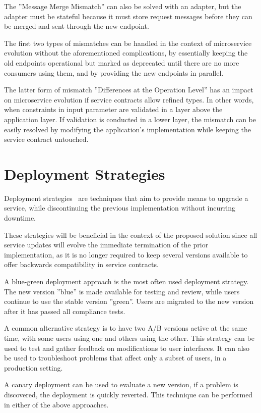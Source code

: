 The ''Message Merge Mismatch'' can also be solved with an adapter, but the adapter must be stateful because it must store request messages before they can be merged and sent through the new endpoint.

The first two types of mismatches can be handled in the context of microservice evolution without the aforementioned complications,
by essentially keeping the old endpoints operational but marked as deprecated until  there are no more consumers using them, and by providing the new endpoints in parallel.

The latter form of mismatch ''Differences at the Operation Level'' has an impact on microservice evolution if service contracts allow refined types.
In other words, when constraints in input parameter are validated in a layer above the application layer.
If validation is conducted in a lower layer, the mismatch can be easily resolved by modifying the application's implementation while keeping the service contract untouched.

\section{Deployment Strategies} %
\label{sec:deployment_strategies}

Deployment strategies~\cite{deploymentstrategies} are techniques that aim to provide means to upgrade a service,
while discontinuing the previous implementation without incurring downtime.

These strategies will be beneficial in the context of the proposed solution since all service updates will evolve the immediate termination of the prior implementation,
as it is no longer required to keep several versions available to offer backwards compatibility in service contracts.

A blue-green deployment approach is the most often used deployment strategy.
The new version ''blue'' is made available for testing and review, while users continue to use the stable version ''green''.
Users are migrated to the new version after it has passed all compliance tests.

A common alternative strategy is to have two A/B versions active at the same time, with some users using one and others using the other.
This strategy can be used to test and gather feedback on modifications to user interfaces.
It can also be used to troubleshoot problems that affect only a subset of users, in a production setting.

A canary deployment can be used to evaluate a new version, if a problem is discovered, the deployment is quickly reverted.
This technique can be performed in either of the above approaches.

